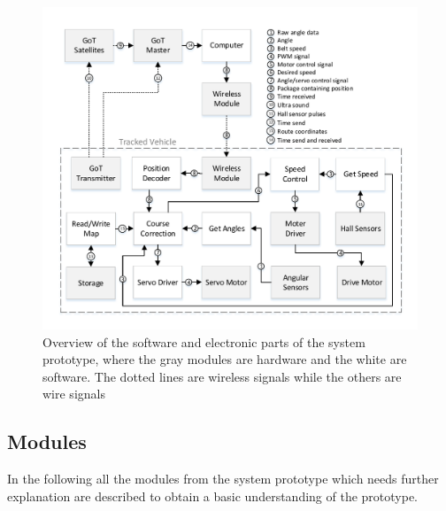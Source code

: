 \begin{figure}[H]
	\centering
	\includegraphics[scale=.9]{figures/systemOverview2}
	\caption{Overview of the software and electronic parts of the system prototype, where the gray modules are hardware and the white are software. The dotted lines are wireless signals while the others are wire signals}
	\label{fig:systemOverview2}
\end{figure}

\subsection{Modules}
In the following all the modules from the system prototype which needs further explanation are described to obtain a basic understanding of the prototype.

%

